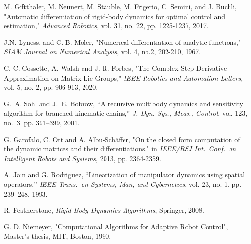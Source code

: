 \documentclass[letterpaper, 10 pt, conference]{ieeetran}  %
\begin{document}
\begin{thebibliography}{99}
M. Giftthaler, M. Neunert, M. Stäuble, M. Frigerio, C. Semini, and J. Buchli, "Automatic differentiation of rigid-body dynamics for optimal control and estimation," \textit{Advanced Robotics}, vol. 31, no. 22, pp. 1225-1237, 2017. %

J.N. Lyness, and C. B. Moler, "Numerical differentiation of analytic functions," \textit{SIAM Journal on Numerical Analysis}, vol. 4, no.2, 202-210, 1967.

C. C. Cossette, A. Walsh and J. R. Forbes, "The Complex-Step Derivative Approximation on Matrix Lie Groups," \textit{IEEE Robotics and Automation Letters}, vol. 5, no. 2, pp. 906-913, 2020. %


G.~A. Sohl and J.~E. Bobrow, ``A recursive multibody dynamics and sensitivity
  algorithm for branched kinematic chains,'' \emph{J. Dyn. Sys., Meas.,
  Control}, vol. 123, no.~3, pp. 391--399, 2001.
  
  

G. Garofalo, C. Ott and A. Albu-Schäffer, "On the closed form computation of the dynamic matrices and their differentiations," in \textit{IEEE/RSJ Int.~Conf.~on Intelligent Robots and Systems}, 2013, pp. 2364-2359. %

  A. Jain and G. Rodriguez, “Linearization of manipulator dynamics using spatial operators,” \textit{IEEE Trans.~on Systems, Man, and Cybernetics}, vol. 23, no. 1, pp. 239–248, 1993. 


R. Featherstone, \textit{Rigid-Body Dynamics Algorithms},
Springer, 2008.



G. D. Niemeyer, "Computational Algorithms for Adaptive Robot Control", Master's thesis, MIT, Boston, 1990.


\end{thebibliography}
\end{document}
